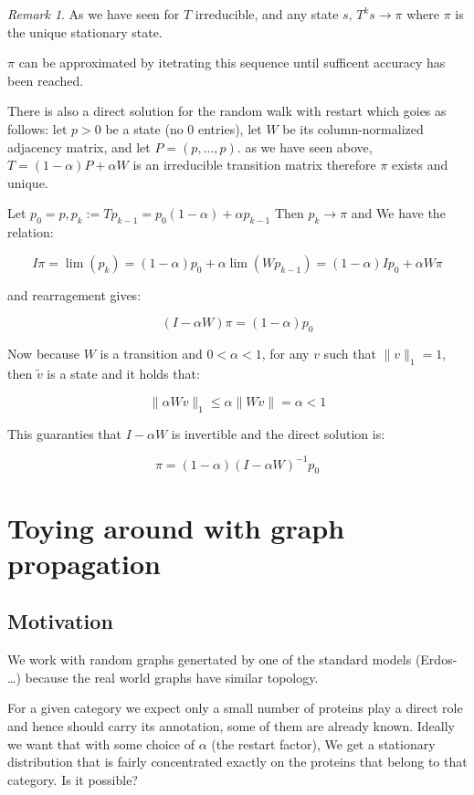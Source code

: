 \documentclass[a4paper,10pt]{article}
\newcommand{\lt}{<}
\theoremstyle{definition}
\theoremstyle{remark}
\newtheorem{remark}{Remark}
\theoremstyle{plain}
\begin{document}
\begin{remark}As we have seen for $T$ irreducible, and any state $s$, 
$T^ks \to \pi$ where $\pi$ is the unique stationary state.

$\pi$ can be approximated by itetrating this sequence until sufficent accuracy 
has been reached.

There is also a direct solution for the random walk with restart which goies as
follows: let $p > 0$ be a state (no $0$ entries), let $W$ be its
column-normalized adjacency matrix, and let $P = (p,\dots,p)$. as we have seen above,
$T = (1 - \alpha)P + \alpha W$ is an irreducible transition matrix
therefore $\pi$ exists and unique.

Let $p_0 = p, p_k := Tp_{k-1} = p_0(1-\alpha) + \alpha p_{k-1}$
Then $p_k \to \pi$ and 
We have the relation:

$$
I \pi = \lim(p_k) = (1 - \alpha)p_0 + \alpha \lim(W p_{k-1}) 
= (1-\alpha)I p_0 + \alpha W \pi
$$

and rearragement gives:

$$
(I - \alpha W)\pi = (1 - \alpha) p_0
$$

Now because $W$ is a transition and $0 < \alpha < 1$, for any $v$
such that $\|v\|_1 = 1$, then $\tilde{v}$ is a state and
it holds that:

$$
\|\alpha W v\|_1 \leq \alpha \|W \tilde{v}\| 
= \alpha \lt 1
$$

This guaranties that $I - \alpha W$ is invertible and
the direct solution is:


\[
\pi = (1 - \alpha) (I - \alpha W)^{-1} p_0
\]

\end{remark}

\section{Toying around with graph propagation}
\subsection{Motivation}
We work with random graphs genertated by one of the standard models (Erdos- \dots)
because the real world graphs have similar topology.

For a given category we expect only a small number of proteins play a direct role and hence should carry
its annotation, some of them are already known. Ideally we want that with some choice of $\alpha$ (the restart factor),
We get a stationary distribution that is fairly concentrated exactly on the proteins that belong to that category.
Is it possible?
\end{document}
